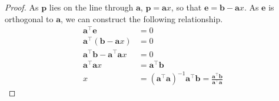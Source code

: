 \documentclass{article}
\begin{document}
\begin{proof}
    As \(\symbf{p}\) lies on the line through
    \(\symbf{a}\), \(\symbf{p}=\symbf{a}x\), so that
    \(\symbf{e}=\symbf{b}-\symbf{a}x\). As \(\symbf{e}\) is
    orthogonal to \(\symbf{a}\), we can construct the following
    relationship.
    \begin{align*}
        \symbf{a}^\top \symbf{e}                             & = 0                                                                                                                                \\
        \symbf{a}^\top \left( \symbf{b} - \symbf{a}x \right) & = 0                                                                                                                                \\
        \symbf{a}^\top \symbf{b} - \symbf{a}^\top \symbf{a}x & = 0                                                                                                                                \\
        \symbf{a}^\top \symbf{a}x                            & = \symbf{a}^\top \symbf{b}                                                                                                         \\
        x                                                    & = \left( \symbf{a}^\top \symbf{a} \right)^{-1}\symbf{a}^\top \symbf{b} = \frac{\symbf{a}^\top \symbf{b}}{\symbf{a}^\top \symbf{a}}
    \end{align*}
\end{proof}
\end{document}
